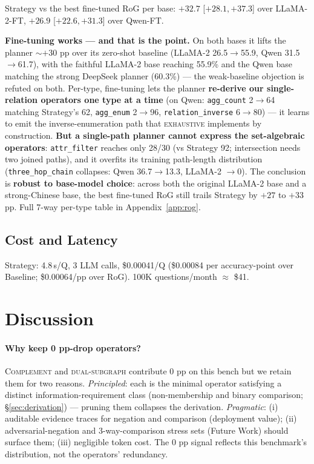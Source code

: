 \documentclass[review]{elsarticle}
\newcommand{\qtype}[1]{\texttt{\small #1}}
\newcommand{\op}[1]{\textsc{\small #1}}
\begin{document}
Strategy vs the best fine-tuned RoG per base: $+32.7$ [$+28.1,+37.3$] over LLaMA-2-FT, $+26.9$ [$+22.6,+31.3$] over Qwen-FT.

\textbf{Fine-tuning works --- and that is the point.} On both bases it lifts the planner ${\sim}{+}30$ pp over its zero-shot baseline (LLaMA-2 26.5$\to$55.9, Qwen 31.5$\to$61.7), with the faithful LLaMA-2 base reaching 55.9\% and the Qwen base matching the strong DeepSeek planner (60.3\%) --- the weak-baseline objection is refuted on both. Per-type, fine-tuning lets the planner \textbf{re-derive our single-relation operators one type at a time} (on Qwen: \qtype{agg\_count} 2$\to$64 matching Strategy's 62, \qtype{agg\_enum} 2$\to$96, \qtype{relation\_inverse} 6$\to$80) --- it learns to emit the inverse-enumeration path that \op{exhaustive} implements by construction. \textbf{But a single-path planner cannot express the set-algebraic operators}: \qtype{attr\_filter} reaches only 28/30 (vs Strategy 92; intersection needs two joined paths), and it overfits its training path-length distribution (\qtype{three\_hop\_chain} collapses: Qwen 36.7$\to$13.3, LLaMA-2 $\to$0). The conclusion is \textbf{robust to base-model choice}: across both the original LLaMA-2 base and a strong-Chinese base, the best fine-tuned RoG still trails Strategy by $+27$ to $+33$ pp. Full 7-way per-type table in Appendix~\ref{app:rog}.

\subsection{Cost and Latency}
Strategy: 4.8\,s/Q, 3 LLM calls, \$0.00041/Q (\$0.00084 per accuracy-point over Baseline; \$0.00064/pp over RoG). 100K questions/month $\approx$ \$41.

\section{Discussion}
\label{sec:discussion}

\paragraph{Why keep 0 pp-drop operators?}
\op{Complement} and \op{dual-subgraph} contribute 0 pp on this bench but we retain them for two reasons. \emph{Principled}: each is the minimal operator satisfying a distinct information-requirement class (non-membership and binary comparison; §\ref{sec:derivation}) --- pruning them collapses the derivation. \emph{Pragmatic}: (i) auditable evidence traces for negation and comparison (deployment value); (ii) adversarial-negation and 3-way-comparison stress sets (Future Work) should surface them; (iii) negligible token cost. The 0 pp signal reflects this benchmark's distribution, not the operators' redundancy.
\end{document}
